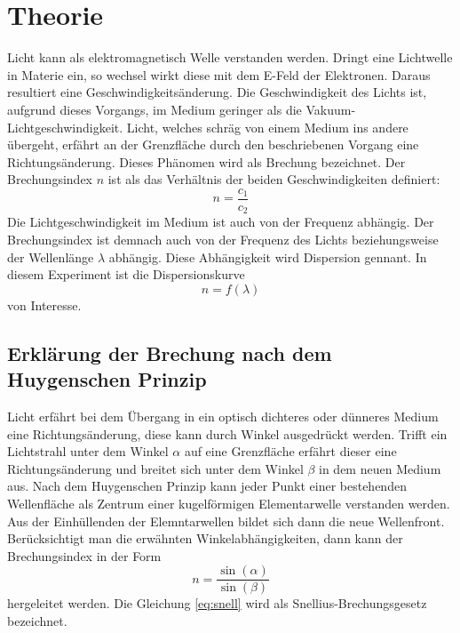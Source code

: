 \section{Theorie}
\label{sec:Theorie}
Licht kann als elektromagnetisch Welle verstanden werden.
Dringt eine Lichtwelle in %
Materie ein, so wechsel wirkt diese mit dem E-Feld der Elektronen.
Daraus resultiert eine Geschwindigkeitsänderung.
Die Geschwindigkeit des Lichts ist, aufgrund dieses Vorgangs, im Medium geringer als die Vakuum-Lichtgeschwindigkeit.
Licht, welches schräg von einem Medium ins andere übergeht, erfährt an der Grenzfläche durch den beschriebenen Vorgang eine Richtungsänderung.
Dieses Phänomen wird als Brechung bezeichnet.
Der Brechungsindex $n$ ist als das Verhältnis der beiden Geschwindigkeiten definiert:
\begin{equation}
  n= \frac{c_1}{c_2}
\end{equation}
Die Lichtgeschwindigkeit im Medium ist auch von der Frequenz abhängig.
Der Brechungsindex ist demnach auch von der Frequenz des Lichts beziehungsweise der Wellenlänge $\lambda$ abhängig.
Diese Abhängigkeit wird Dispersion gennant.
In diesem Experiment ist die Dispersionskurve
\begin{equation}
  n= f(\lambda)
\end{equation}
von Interesse.
\subsection{Erklärung der Brechung nach dem Huygenschen Prinzip}
Licht erfährt bei dem Übergang in ein optisch dichteres oder dünneres Medium eine Richtungsänderung, diese kann durch Winkel ausgedrückt werden.
Trifft ein Lichtstrahl unter dem Winkel $\alpha$ auf eine Grenzfläche erfährt dieser eine Richtungsänderung und breitet sich unter dem Winkel $\beta$ in dem neuen Medium aus.
Nach dem Huygenschen Prinzip kann jeder Punkt einer bestehenden Wellenfläche als Zentrum einer kugelförmigen Elementarwelle verstanden werden.
Aus der Einhüllenden der Elemntarwellen bildet sich dann die neue Wellenfront.
Berücksichtigt man die erwähnten Winkelabhängigkeiten, dann kann der Brechungsindex in der Form
\begin{equation}
  \label{eq:snell}
  n = \frac{\sin(\alpha)}{\sin(\beta)}
\end{equation}
hergeleitet werden.
Die Gleichung \eqref{eq:snell} wird als Snellius-Brechungsgesetz bezeichnet.
